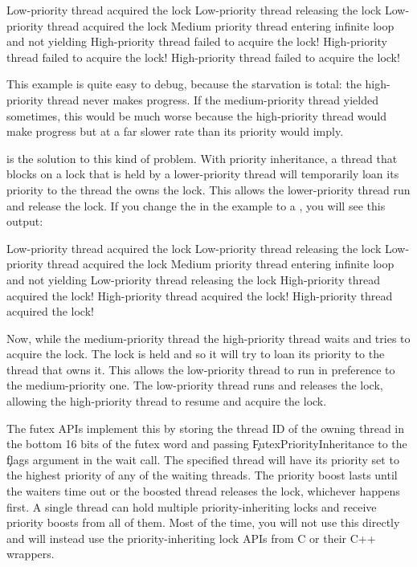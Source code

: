 \begin{console}
Low-priority thread acquired the lock
Low-priority thread releasing the lock
Low-priority thread acquired the lock
Medium priority thread entering infinite loop and not yielding
High-priority thread failed to acquire the lock!
High-priority thread failed to acquire the lock!
High-priority thread failed to acquire the lock!
\end{console}

This example is quite easy to debug, because the starvation is total: the high-priority thread never makes progress.
If the medium-priority thread yielded sometimes, this would be much worse because the high-priority thread would make progress but at a far slower rate than its priority would imply.

 is the solution to this kind of problem.
With priority inheritance, a thread that blocks on a lock that is held by a lower-priority thread will temporarily loan its priority to the thread the owns the lock.
This allows the lower-priority thread run and release the lock.
If you change the  in the example to a , you will see this output:

\begin{console}
Low-priority thread acquired the lock
Low-priority thread releasing the lock
Low-priority thread acquired the lock
Medium priority thread entering infinite loop and not yielding
Low-priority thread releasing the lock
High-priority thread acquired the lock!
High-priority thread acquired the lock!
High-priority thread acquired the lock!
\end{console}

Now, while the medium-priority thread the high-priority thread waits and tries to acquire the lock.
The lock is held and so it will try to loan its priority to the thread that owns it.
This allows the low-priority thread to run in preference to the medium-priority one.
The low-priority thread runs and releases the lock, allowing the high-priority thread to resume and acquire the lock.

The futex APIs implement this by storing the thread ID of the owning thread in the bottom 16 bits of the futex word and passing \c{FutexPriorityInheritance} to the \c{flags} argument in the wait call.
The specified thread will have its priority set to the highest priority of any of the waiting threads.
The priority boost lasts until the waiters time out or the boosted thread releases the lock, whichever happens first.
A single thread can hold multiple priority-inheriting locks and receive priority boosts from all of them.
Most of the time, you will not use this directly and will instead use the priority-inheriting lock APIs from C or their C++ wrappers.

